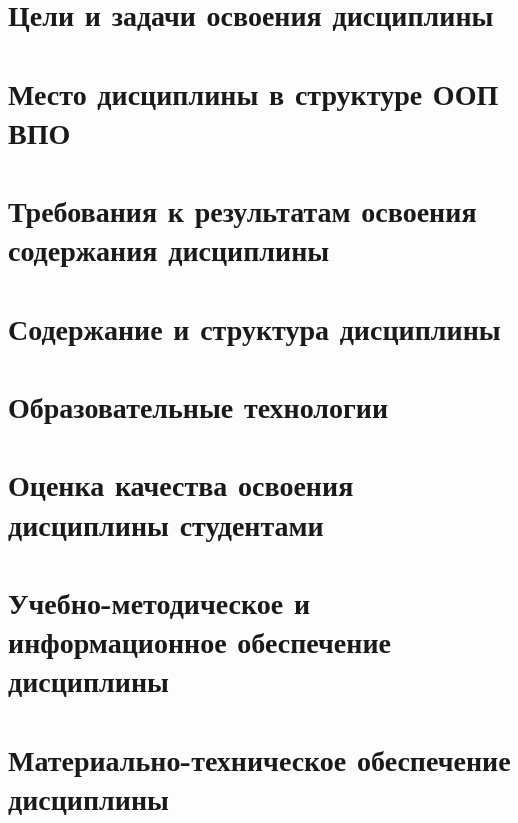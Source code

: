 






\section{Цели и задачи освоения дисциплины}


\section{Место дисциплины в структуре ООП ВПО}


\section{Требования к результатам освоения содержания дисциплины}


\section{Содержание и структура дисциплины}


\section{Образовательные технологии}



\section{Оценка качества освоения дисциплины студентами}


\section{Учебно-методическое и информационное обеспечение дисциплины}


\section{Материально-техническое обеспечение дисциплины}


% 
% 


